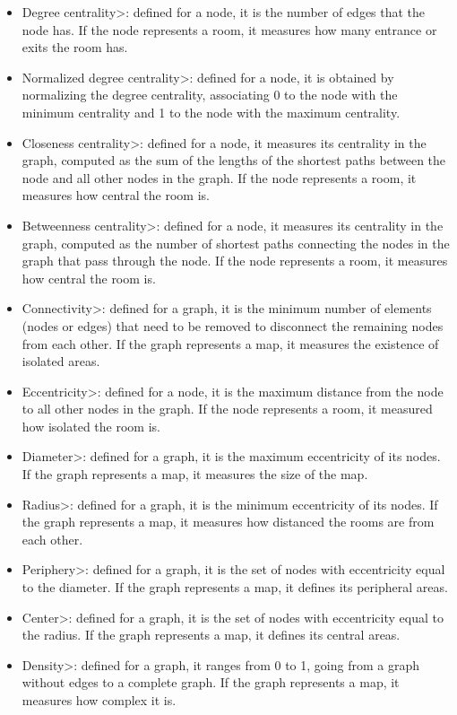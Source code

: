 \begin{itemize}
\item \<Degree centrality>: defined for a node, it is the number of edges that the node has. If the node represents a room, it measures how many entrance or exits the room has.
\item \<Normalized degree centrality>: defined for a node, it is obtained by normalizing the degree centrality, associating 0 to the node with the minimum centrality and 1 to the node with the maximum centrality.
\item \<Closeness centrality>: defined for a node, it measures its centrality in the graph, computed as the sum of the lengths of the shortest paths between the node and all other nodes in the graph. If the node represents a room, it measures how central the room is.
\item \<Betweenness centrality>: defined for a node, it measures its centrality in the graph, computed as the number of shortest paths connecting the nodes in the graph that pass through the node. If the node represents a room, it measures how central the room is.
\item \<Connectivity>: defined for a graph, it is the minimum number of elements (nodes or edges) that need to be removed to disconnect the remaining nodes from each other. If the graph represents a map, it measures the existence of isolated areas.
\item \<Eccentricity>: defined for a node, it is the maximum distance from the node to all other nodes in the graph. If the node represents a room, it measured how isolated the room is.
\item \<Diameter>: defined for a graph, it is the maximum eccentricity of its nodes. If the graph represents a map, it measures the size of the map.
\item \<Radius>: defined for a graph, it is the minimum eccentricity of its nodes. If the graph represents a map, it measures how distanced the rooms are from each other.
\item \<Periphery>: defined for a graph, it is the set of nodes with eccentricity equal to the diameter. If the graph represents a map, it defines its peripheral areas.
\item \<Center>: defined for a graph, it is the set of nodes with eccentricity equal to the radius. If the graph represents a map, it defines its central areas.
\item \<Density>: defined for a graph, it ranges from 0 to 1, going from a graph without edges to a complete graph. If the graph represents a map, it measures how complex it is.
\end{itemize}

